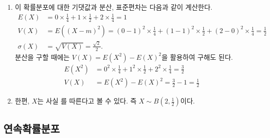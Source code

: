 \documentclass[t,8pt]{beamer}
\newcounter{num}
\newcommand{\rb}[2]%
{\fbox{\uncover<#1>{\red{\ensuremath{#2}}}}}
\newcommand{\red}[1]{\color{red}{#1}}
\begin{document}
\begin{frame}[t]{\subsecname}
\begin{enumerate}[(1)]
\setcounter{enumi}3
\item
이 확률분포에 대한 기댓값과 분산, 표준편차는 다음과 같이 계산한다.
\begin{align*}
E(X)			&=0\times\frac14+1\times\frac12+2\times\frac14=1\\
V(X)			&=E((X-m)^2)=(0-1)^2\times\frac14+(1-1)^2\times\frac12+(2-0)^2\times\frac14=\frac12\\
\sigma(X)	&=\sqrt{V(X)}=\frac{\sqrt2}2.
\end{align*}
\pause
분산을 구할 때에는 \(V(X)=E(X^2)-E(X)^2\)을 활용하여 구해도 된다.
\begin{align*}
E(X^2)		&=0^2\times\frac14+1^2\times\frac12+2^2\times\frac14=\frac32\\
V(X)			&=E(X^2)-E(X)^2=\frac32-1=\frac12
\end{align*}
\item<3->
한편, \(X\)는 사실 \rb{4}{\text{이항분포}}를 따른다고 볼 수 있다.
즉 \(X\sim B(2,\frac12)\)이다.
\end{enumerate}
\end{frame}

\subsection{연속확률분포}
\end{document}
